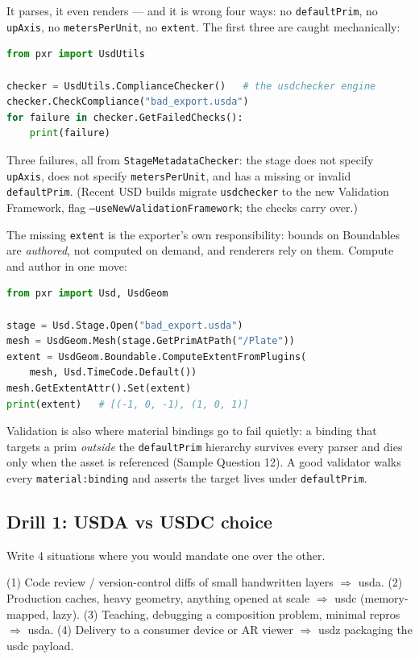 \noindent It parses, it even renders --- and it is wrong four ways: no
\texttt{defaultPrim}, no \texttt{upAxis}, no \texttt{metersPerUnit}, no
\texttt{extent}. The first three are caught mechanically:

\begin{lstlisting}[language=Python]
from pxr import UsdUtils

checker = UsdUtils.ComplianceChecker()   # the usdchecker engine
checker.CheckCompliance("bad_export.usda")
for failure in checker.GetFailedChecks():
    print(failure)
\end{lstlisting}

\noindent Three failures, all from \texttt{StageMetadataChecker}: the stage
does not specify \texttt{upAxis}, does not specify \texttt{metersPerUnit},
and has a missing or invalid \texttt{defaultPrim}. (Recent USD builds migrate
\texttt{usdchecker} to the new Validation Framework, flag
\texttt{--useNewValidationFramework}; the checks carry over.)

The missing \texttt{extent} is the exporter's own responsibility: bounds on
Boundables are \emph{authored}, not computed on demand, and renderers rely on
them. Compute and author in one move:

\begin{lstlisting}[language=Python]
from pxr import Usd, UsdGeom

stage = Usd.Stage.Open("bad_export.usda")
mesh = UsdGeom.Mesh(stage.GetPrimAtPath("/Plate"))
extent = UsdGeom.Boundable.ComputeExtentFromPlugins(
    mesh, Usd.TimeCode.Default())
mesh.GetExtentAttr().Set(extent)
print(extent)   # [(-1, 0, -1), (1, 0, 1)]
\end{lstlisting}

\begin{Gotcha}
Validation is also where material bindings go to fail quietly: a binding that
targets a prim \emph{outside} the \texttt{defaultPrim} hierarchy survives
every parser and dies only when the asset is referenced (Sample Question 12).
A good validator walks every \texttt{material:binding} and asserts the target
lives under \texttt{defaultPrim}.
\end{Gotcha}

\DrillsTitle
\subsection*{Drill 1: USDA vs USDC choice}
Write 4 situations where you would mandate one over the other.
\begin{DrillSolution}
(1) Code review / version-control diffs of small handwritten layers
$\Rightarrow$ usda. (2) Production caches, heavy geometry, anything opened at
scale $\Rightarrow$ usdc (memory-mapped, lazy). (3) Teaching, debugging a
composition problem, minimal repros $\Rightarrow$ usda. (4) Delivery to a
consumer device or AR viewer $\Rightarrow$ usdz packaging the usdc payload.
\end{DrillSolution}

